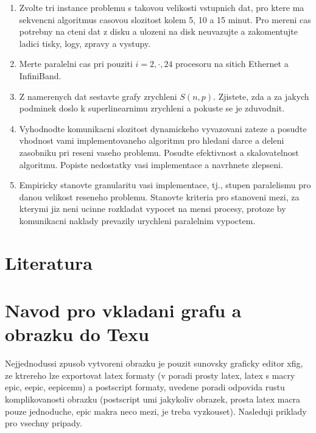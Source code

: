 \begin{enumerate}
\item Zvolte tri instance problemu s takovou velikosti vstupnich dat, pro ktere ma sekvencni 
algoritmus casovou slozitost kolem 5, 10 a 15 minut.
Pro mereni cas potrebny na cteni dat z disku a ulozeni na disk neuvazujte a zakomentujte
ladici tisky, logy, zpravy a vystupy.
\item Merte paralelni cas pri pouziti $i=2,\cdot,24$ procesoru na sitich Ethernet a InfiniBand.
\item Z namerenych dat sestavte grafy zrychleni $S(n,p)$. Zjistete, zda a za jakych podminek
doslo k superlinearnimu zrychleni a pokuste se je zduvodnit.
\item Vyhodnodte komunikacni slozitost dynamickeho vyvazovani zateze a posudte
vhodnost vami implementovaneho algoritmu pro hledani darce a deleni zasobniku pri reseni vaseho
problemu. Posudte efektivnost a skalovatelnost algoritmu. Popiste nedostatky
vasi implementace a navrhnete zlepseni.
\item Empiricky stanovte 
granularitu vasi implementace, tj., stupen paralelismu pro danou velikost reseneho
problemu. Stanovte kriteria pro stanoveni mezi, za kterymi jiz neni
ucinne rozkladat vypocet na mensi procesy, protoze by komunikacni
naklady prevazily urychleni paralelnim vypoctem.

\end{enumerate}

\section{Literatura}

\appendix

\section{Navod pro vkladani grafu a obrazku do Texu}

Nejjednodussi zpusob vytvoreni obrazku je pouzit sunovsky graficky editor xfig,
ze ktrereho lze exportovat latex formaty (v poradi prosty latex, 
latex s macry epic, eepic, eepicemu) a postscript formaty,
uvedene poradi odpovida rustu komplikovanosti obrazku
(postscript umi jakykoliv obrazek, prosta latex macra pouze jednoduche,
epic makra neco mezi, je treba vyzkouset). Nasleduji priklady
pro vsechny pripady. 

